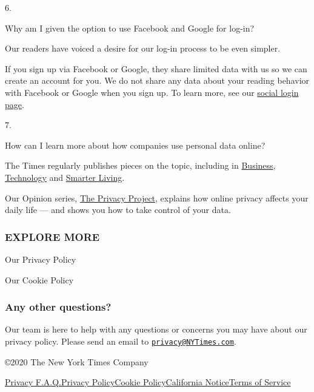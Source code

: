 6.

Why am I given the option to use Facebook and Google for log-in?

Our readers have voiced a desire for our log-in process to be even
simpler.

If you sign up via Facebook or Google, they share limited data with us
so we can create an account for you. We do not share any data about your
reading behavior with Facebook or Google when you sign up. To learn
more, see our
\href{https://help.nytimes3xbfgragh.onion/hc/en-us/articles/115014887628-Social-login}{social
login page}.

7.

How can I learn more about how companies use personal data online?

The Times regularly publishes pieces on the topic, including in
\href{https://www.nytimes3xbfgragh.onion/2019/11/04/business/secret-consumer-score-access.html}{Business},
\href{https://www.nytimes3xbfgragh.onion/2019/11/19/technology/artificial-intelligence-dawn-song.html}{Technology}
and
\href{https://www.nytimes3xbfgragh.onion/2019/11/24/smarter-living/privacy-online-how-to-stop-advertiser-tracking-opt-out.html}{Smarter
Living}.

Our Opinion series,
\href{https://www.nytimes3xbfgragh.onion/series/new-york-times-privacy-project}{The
Privacy Project}, explains how online privacy affects your daily life
--- and shows you how to take control of your data.

\hypertarget{explore-more}{%
\subsubsection{EXPLORE MORE}\label{explore-more}}

\href{/privacy/privacy-policy}{}

Our Privacy Policy

\href{/privacy/cookie-policy}{}

Our Cookie Policy

\hypertarget{any-other-questions}{%
\subsubsection{Any other questions?}\label{any-other-questions}}

Our team is here to help with any questions or concerns you may have
about our privacy policy. Please send an email to
\href{mailto:privacy@NYTimes.com}{\nolinkurl{privacy@NYTimes.com}}.

©2020 The New York Times Company

\href{/privacy}{Privacy F.A.Q.}\href{/privacy/privacy-policy}{Privacy
Policy}\href{/privacy/cookie-policy}{Cookie
Policy}\href{/privacy/california-notice}{California
Notice}\href{https://help.nytimes3xbfgragh.onion/hc/en-us/articles/115014893428-Terms-of-service}{Terms
of Service}
